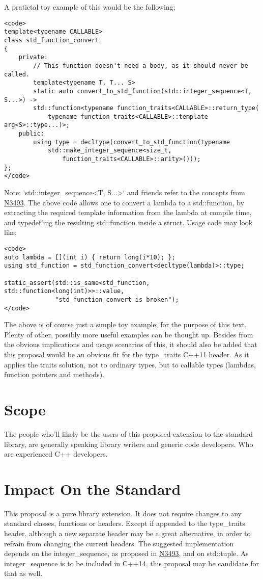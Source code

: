 A pratictal toy example of this would be the following;
\begin{verbatim}
<code>
template<typename CALLABLE>
class std_function_convert
{
    private:
        // This function doesn't need a body, as it should never be called.
        template<typename T, T... S>
        static auto convert_to_std_function(std::integer_sequence<T, S...>) ->
        std::function<typename function_traits<CALLABLE>::return_type(
            typename function_traits<CALLABLE>::template arg<S>::type...)>;
    public:
        using type = decltype(convert_to_std_function(typename
            std::make_integer_sequence<size_t,
                function_traits<CALLABLE>::arity>()));
};
</code>
\end{verbatim}
Note: `std::integer\_sequence<T, S...>` and friends refer to the concepts from
\href{http://www.open-std.org/jtc1/sc22/wg21/docs/papers/2013/n3493.html}{N3493}.
\noindent
The above code allows one to convert a lambda to a std::function, by extracting the
required template information from the lambda at compile time, and typedef'ing
the resulting std::function inside a struct. Usage code may look like;
\begin{verbatim}
<code>
auto lambda = [](int i) { return long(i*10); };
using std_function = std_function_convert<decltype(lambda)>::type;

static_assert(std::is_same<std_function, std::function<long(int)>>::value,
              "std_function_convert is broken");
</code>
\end{verbatim}
The above is of course just a simple toy example, for the purpose of this text.
Plenty of other, possibly more useful examples can be thought up. 
\newline
Besides from the obvious implications and usage scenarios of this, it should
also be added that this proposal would be an obvious fit for the type\_traits
C++11 header. As it applies the traits solution, not to ordinary types, but to
callable types (lambdas, function pointers and methods).

\section{Scope}
The people who'll likely be the users of this proposed extension to the standard
library, are generally speaking library writers and generic code developers.
Who are experienced C++ developers.

\section{Impact On the Standard}
This proposal is a pure library extension. It does not require changes to any
standard classes, functions or headers. Except if appended to the type\_traits
header, although a new separate header may be a great alternative, in order to
refrain from changing the current headers.
\noindent
The suggested implementation depends on the integer\_sequence, as proposed in 
\href{http://www.open-std.org/jtc1/sc22/wg21/docs/papers/2013/n3493.html}{N3493},
and on std::tuple. As integer\_sequence is to be included in C++14, this proposal
may be candidate for that as well.


